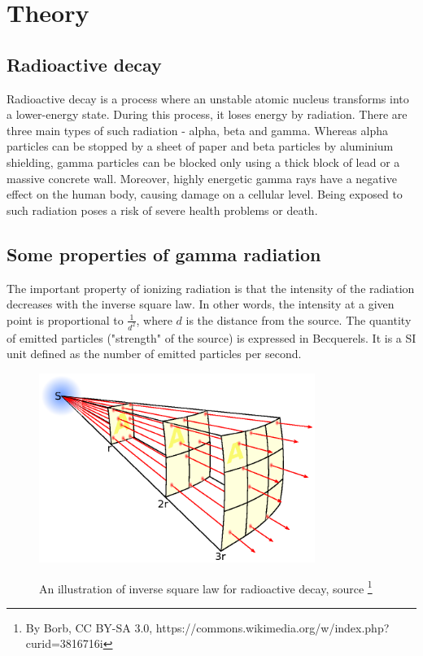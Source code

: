 
\chapter{Theory\label{chap:theory}}
\section{Radioactive decay}
Radioactive decay is a process where an unstable atomic nucleus transforms into a lower-energy state.
During this process, it loses energy by radiation.
There are three main types of such radiation - alpha, beta and gamma.
Whereas alpha particles can be stopped by a sheet of paper and beta particles by aluminium shielding, gamma particles can be blocked only using a thick block of lead or a massive concrete wall.
Moreover, highly energetic gamma rays have a negative effect on the human body, causing damage on a cellular level.
Being exposed to such radiation poses a risk of severe health problems or death.

\section{Some properties of gamma radiation}
The important property of ionizing radiation is that the intensity of the radiation decreases with the inverse square law.
In other words, the intensity at a given point is proportional to $\frac{1}{d^{2}}$, where $d$ is the distance from the source.
The quantity of emitted particles ("strength" of the source) is expressed in Becquerels.
It is a SI unit defined as the number of emitted particles per second.
\begin{figure}[!h]
  \centering
    \includegraphics[width=0.8\textwidth]{./fig/photos/Inverse_square_law.eps}
    \label{fig:isl}
  \caption{An illustration of inverse square law for radioactive decay, source \protect \footnote{By Borb, CC BY-SA 3.0, https://commons.wikimedia.org/w/index.php?curid=3816716i}}
\end{figure}


